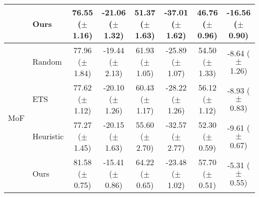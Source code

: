 \begin{table}[t]
{\begin{tabular}{l l c c c c c c}
         & Ours & 76.55 ($\pm$ 1.16) & -21.06 ($\pm$ 1.32) & 51.37 ($\pm$ 1.63) & -37.01 ($\pm$ 1.62) & 46.76 ($\pm$ 0.96) & -16.56 ($\pm$ 0.90) \\
        \midrule
        \multirow{4}{*}{MoF} & Random & 77.96 ($\pm$ 1.84) & -19.44 ($\pm$ 2.13) & 61.93 ($\pm$ 1.05) & -25.89 ($\pm$ 1.07) & 54.50 ($\pm$ 1.33) & -8.64 ($\pm$ 1.26) \\
         & ETS & 77.62 ($\pm$ 1.12) & -20.10 ($\pm$ 1.26) & 60.43 ($\pm$ 1.17) & -28.22 ($\pm$ 1.26) & 56.12 ($\pm$ 1.12) & -8.93 ($\pm$ 0.83) \\
         & Heuristic & 77.27 ($\pm$ 1.45) & -20.15 ($\pm$ 1.63) & 55.60 ($\pm$ 2.70) & -32.57 ($\pm$ 2.77) & 52.30 ($\pm$ 0.59) & -9.61 ($\pm$ 0.67) \\
         & Ours & 81.58 ($\pm$ 0.75) & -15.41 ($\pm$ 0.86) & 64.22 ($\pm$ 0.65) & -23.48 ($\pm$ 1.02) & 57.70 ($\pm$ 0.51) & -5.31 ($\pm$ 0.55) \\
        \bottomrule
    \end{tabular}
    }
    \vspace{-2mm}
    \label{tab:bwt_alternative_memory_selection}
\end{table}


